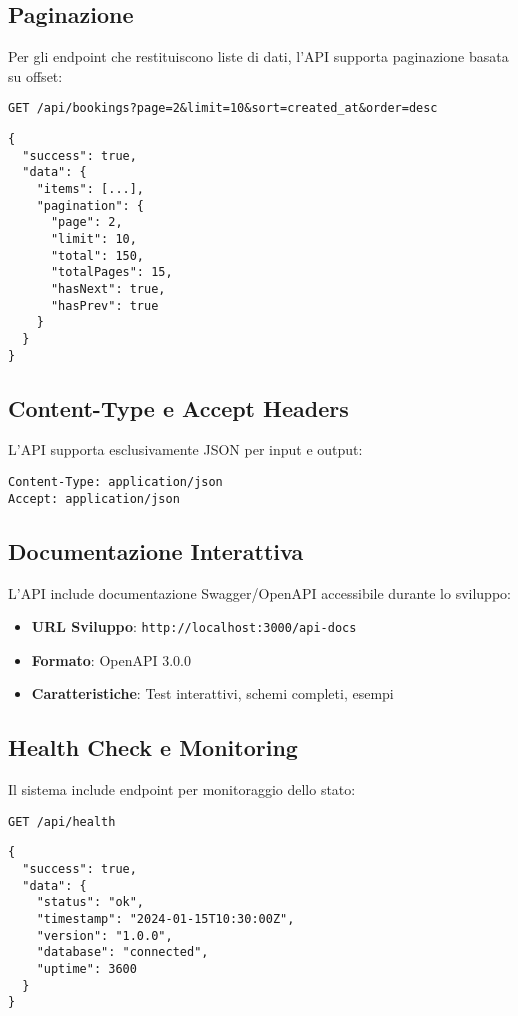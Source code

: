 \newpage

\subsection{Paginazione}
Per gli endpoint che restituiscono liste di dati, l'API supporta paginazione basata su offset:

\begin{lstlisting}[style=httpstyle, caption=Parametri di Paginazione]
GET /api/bookings?page=2&limit=10&sort=created_at&order=desc
\end{lstlisting}

\begin{lstlisting}[caption=Risposta con Metadati di Paginazione]
{
  "success": true,
  "data": {
    "items": [...],
    "pagination": {
      "page": 2,
      "limit": 10,
      "total": 150,
      "totalPages": 15,
      "hasNext": true,
      "hasPrev": true
    }
  }
}
\end{lstlisting}

\subsection{Content-Type e Accept Headers}
L'API supporta esclusivamente JSON per input e output:

\begin{lstlisting}[style=httpstyle, caption=Headers Richiesti]
Content-Type: application/json
Accept: application/json
\end{lstlisting}

\subsection{Documentazione Interattiva}
L'API include documentazione Swagger/OpenAPI accessibile durante lo sviluppo:

\begin{itemize}
    \item \textbf{URL Sviluppo}: \texttt{http://localhost:3000/api-docs}
    \item \textbf{Formato}: OpenAPI 3.0.0
    \item \textbf{Caratteristiche}: Test interattivi, schemi completi, esempi
\end{itemize}

\subsection{Health Check e Monitoring}
Il sistema include endpoint per monitoraggio dello stato:

\begin{lstlisting}[style=httpstyle, caption=Health Check Endpoint]
GET /api/health
\end{lstlisting}

\begin{lstlisting}[caption=Risposta Health Check]
{
  "success": true,
  "data": {
    "status": "ok",
    "timestamp": "2024-01-15T10:30:00Z",
    "version": "1.0.0",
    "database": "connected",
    "uptime": 3600
  }
}
\end{lstlisting}
